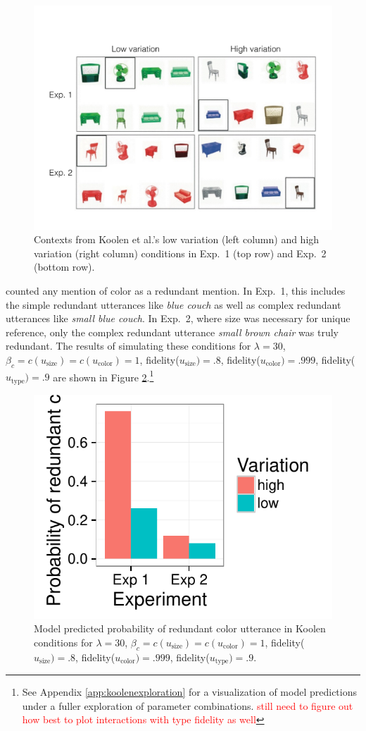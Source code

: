 \documentclass[11pt]{article}
\newcommand{\red}[1]{\textcolor{Red}{#1}}
\newcommand{\figref}[1]{Figure \ref{#1}}
\newcommand{\appref}[1]{Appendix \ref{#1}}
\begin{document}
\begin{figure}
\centering
\includegraphics[width=\textwidth]{pics/koolen-conditions}
\caption{Contexts from Koolen et al.'s low variation (left column) and high variation (right column) conditions in Exp.~1 (top row) and Exp.~2 (bottom row).}
\label{fig:koolencontexts}
\end{figure}

 counted any mention of color as a redundant mention. In Exp.~1, this includes the simple redundant utterances like \emph{blue couch} as well as complex redundant utterances like \emph{small blue couch}. In Exp.~2, where size was necessary for unique reference, only the complex redundant utterance \emph{small brown chair} was truly redundant.  The results of simulating these conditions for $\lambda = 30$, $ \beta_c = c(u_{\textrm{size}}) = c(u_{\textrm{color}}) = 1$, fidelity($u_{\textrm{size}}) = .8$, fidelity($u_{\textrm{color}}) = .999$, fidelity($u_{\textrm{type}}) = .9$ are shown in \figref{fig:koolensimulationresults}.\footnote{See \appref{app:koolenexploration} for a visualization of model predictions under a fuller exploration of parameter combinations. \red{still need to figure out how best to plot interactions with type fidelity as well}}


\begin{figure}
\centering
\includegraphics[width=.4\textwidth]{pics/koolen-effect}
\caption{Model predicted probability of redundant color utterance in Koolen conditions for $\lambda = 30$, $ \beta_c = c(u_{\textrm{size}}) = c(u_{\textrm{color}}) = 1$, fidelity($u_{\textrm{size}}) = .8$, fidelity($u_{\textrm{color}}) = .999$, fidelity($u_{\textrm{type}}) = .9$.}
\label{fig:koolensimulationresults}
\end{figure}
\end{document}
